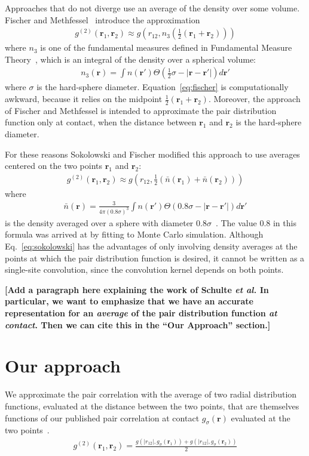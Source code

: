 \documentclass[letterpaper,twocolumn,amsmath,amssymb,pre,aps,10pt]{revtex4-1}
\newcommand{\red}[1]{{\bf \color{red} #1}}
\newcommand{\rr}{\textbf{r}}
\newcommand{\fixme}[1]{\red{[#1]}}
\begin{document}
Approaches that do not diverge use an average of the density over some
volume. Fischer and Methfessel~\cite{fischer1980born} introduce the
approximation
\begin{align}
  g^{(2)}(\rr_1,\rr_2) \approx g\left(r_{12}, n_3\left(\tfrac12
  (\rr_1+\rr_2)\right)\right)
  \label{eq:fischer}
\end{align}
where $n_3$ is one of the fundamental measures defined in Fundamental
Measure Theory~\cite{rosenfeld1989free}, which is an integral of the
density over a spherical volume:
\begin{align}
  n_3(\rr) = \int n(\rr')\Theta(\tfrac12 \sigma - |\rr-\rr'|) d\rr'
\end{align}
where $\sigma$ is the hard-sphere diameter.  Equation~\ref{eq:fischer}
is computationally awkward, because it relies on the midpoint
$\tfrac12(\rr_1+\rr_2)$.  Moreover, the approach of Fischer and
Methfessel is intended to approximate the pair distribution function only
at contact, when the distance between $\rr_1$ and $\rr_2$ is the hard-sphere
diameter.

For these reasons Sokolowski and Fischer modified this approach to use
averages centered on the two points $\rr_1$ and $\rr_2$:
\begin{align}
  g^{(2)}(\rr_1,\rr_2) \approx g\left(r_{12},
  \tfrac12(\bar{n}(\rr_1)+\bar{n}(\rr_2))\right)
  \label{eq:sokolowski}
\end{align}
where
\begin{align}
  \bar{n}(\rr) = \frac{3}{4\pi (0.8\sigma)^3}\int n(\rr')\Theta(0.8\sigma - |\rr-\rr'|) d\rr'
\end{align}
is the density averaged over a sphere with diameter
$0.8\sigma$~\cite{sokolowski1992role}.  The value 0.8 in this formula
was arrived at by fitting to Monte Carlo simulation.  Although
Eq.~\ref{eq:sokolowski} has the advantages of only involving density
averages at the points at which the pair distribution function is
desired, it cannot be written as a single-site convolution, since the
convolution kernel depends on both points.

\fixme{Add a paragraph here explaining the work of Schulte {\em et
    al.}  In particular, we want to emphasize that we have an accurate
representation for an \emph{average} of the pair distribution function
\emph{at contact}.  Then we can cite this in the ``Our Approach''
section.}

\section{Our approach}
We approximate the pair correlation with the average of two radial
distribution functions, evaluated at the distance between the two
points, that are themselves functions of our published pair
correlation at contact $g_{\sigma}(\rr)$ evaluated at the two
points~\cite{schulte2012using}.
\begin{align}
  g^{(2)}(\rr_1,\rr_2) = \frac{g(|r_{12}|, g_\sigma(\rr_1)) + g(|r_{12}|, g_\sigma(\rr_2))}{2}
\end{align}
\end{document}

